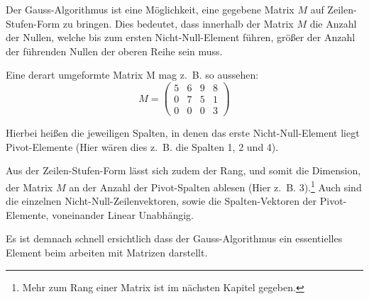 Der Gauss-Algorithmus ist eine Möglichkeit, eine gegebene Matrix $M$ auf Zeilen-Stufen-Form zu bringen.
Dies bedeutet, dass innerhalb der Matrix $M$ die Anzahl der Nullen, welche bis zum ersten Nicht-Null-Element führen, größer der Anzahl der führenden Nullen der oberen Reihe sein muss.

Eine derart umgeformte Matrix M mag z.~B. so aussehen:
\[ M = \begin{pmatrix}
5 & 6 & 9 & 8\\ 
0 & 7 & 5 & 1\\ 
0 & 0 & 0 & 3
\end{pmatrix} \]

Hierbei heißen die jeweiligen Spalten, in denen das erste Nicht-Null-Element liegt Pivot-Elemente (Hier wären dies z.~B. die Spalten 1, 2 und 4).

Aus der Zeilen-Stufen-Form lässt sich zudem der Rang, und somit die Dimension, der Matrix $M$ an der Anzahl der Pivot-Spalten ablesen (Hier z.~B. 3).\footnote{Mehr zum Rang einer Matrix ist im nächsten Kapitel gegeben.}
Auch sind die einzelnen Nicht-Null-Zeilenvektoren, sowie die Spalten-Vektoren der Pivot-Elemente, voneinander Linear Unabhängig.

Es ist demnach schnell ersichtlich dass der Gauss-Algorithmus ein essentielles Element beim arbeiten mit Matrizen darstellt.